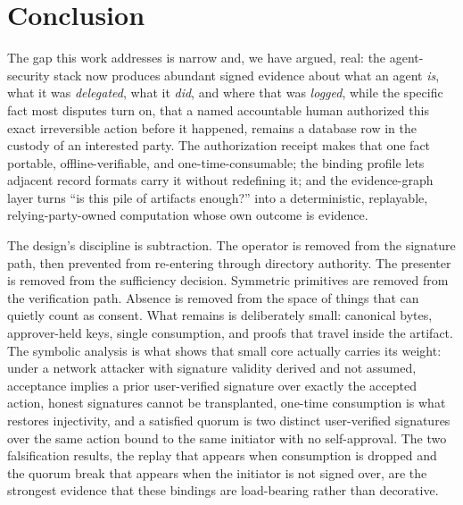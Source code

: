 \documentclass[11pt]{article}
\begin{document}
\section{Conclusion}

The gap this work addresses is narrow and, we have argued, real: the agent-security
stack now produces abundant signed evidence about what an agent \emph{is}, what it
was \emph{delegated}, what it \emph{did}, and where that was \emph{logged}, while
the specific fact most disputes turn on, that a named accountable human authorized
this exact irreversible action before it happened, remains a database row in the
custody of an interested party. The authorization receipt makes that one fact
portable, offline-verifiable, and one-time-consumable; the binding profile lets
adjacent record formats carry it without redefining it; and the evidence-graph layer
turns ``is this pile of artifacts enough?'' into a deterministic, replayable,
relying-party-owned computation whose own outcome is evidence.

The design's discipline is subtraction. The operator is removed from the signature
path, then prevented from re-entering through directory authority. The presenter is
removed from the sufficiency decision. Symmetric primitives are removed from the
verification path. Absence is removed from the space of things that can quietly
count as consent. What remains is deliberately small: canonical bytes, approver-held
keys, single consumption, and proofs that travel inside the artifact. The symbolic
analysis is what shows that small core actually carries its weight: under a network
attacker with signature validity derived and not assumed, acceptance implies a prior
user-verified signature over exactly the accepted action, honest signatures cannot
be transplanted, one-time consumption is what restores injectivity, and a satisfied
quorum is two distinct user-verified signatures over the same action bound to the
same initiator with no self-approval. The two falsification results, the replay that
appears when consumption is dropped and the quorum break that appears when the
initiator is not signed over, are the strongest evidence that these bindings are
load-bearing rather than decorative.
\end{document}
